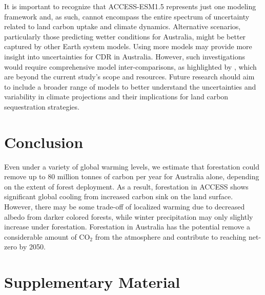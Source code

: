 \documentclass[]{article}
\begin{document}
It is important to recognize that ACCESS-ESM1.5 represents just one modeling framework and, as such, cannot encompass the entire spectrum of uncertainty related to land carbon uptake and climate dynamics.
Alternative scenarios, particularly those predicting wetter conditions for Australia, might be better captured by other Earth system models.
Using more models may provide more insight into uncertainties for CDR in Australia.
However, such investigations would require comprehensive model inter-comparisons, as highlighted by \textcite{loughran_limited_2023}, which are beyond the current study's scope and resources.
Future research should aim to include a broader range of models to better understand the uncertainties and variability in climate projections and their implications for land carbon sequestration strategies.

\section{Conclusion}

Even under a variety of global warming levels, we estimate that forestation could remove up to 80 million tonnes of carbon per year for Australia alone, depending on the extent of forest deployment.
As a result, forestation in ACCESS shows significant global cooling from increased carbon sink on the land surface.
However, there may be some trade-off of localized warming due to decreased albedo from darker colored forests, while winter precipitation may only slightly increase under forestation.
Forestation in Australia has the potential remove a considerable amount of CO$_2$ from the atmosphere and contribute to reaching net-zero by 2050.


\printbibliography

\section{Supplementary Material}
\setcounter{figure}{0}
\end{document}
